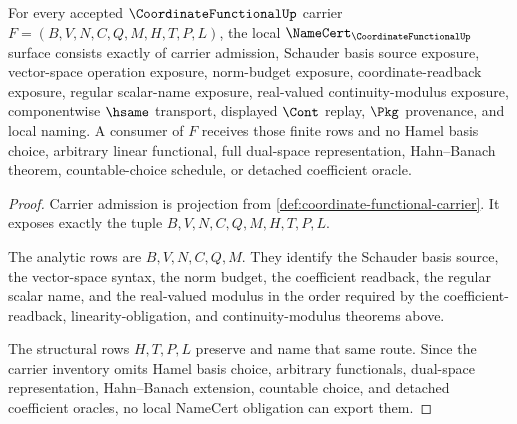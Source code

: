 \begin{theorem}
\label{thm:coordinate-functional-namecert-obligations}
For every accepted $\CoordinateFunctionalUp$ carrier $F=(B,V,N,C,Q,M,H,T,P,L)$, the local $\NameCert_{\CoordinateFunctionalUp}$ surface consists exactly of carrier admission, Schauder basis source exposure, vector-space operation exposure, norm-budget exposure, coordinate-readback exposure, regular scalar-name exposure, real-valued continuity-modulus exposure, componentwise $\hsame$ transport, displayed $\Cont$ replay, $\Pkg$ provenance, and local naming. A consumer of $F$ receives those finite rows and no Hamel basis choice, arbitrary linear functional, full dual-space representation, Hahn--Banach theorem, countable-choice schedule, or detached coefficient oracle.
\end{theorem}
\begin{proof}
Carrier admission is projection from \autoref{def:coordinate-functional-carrier}. It exposes exactly the tuple $B,V,N,C,Q,M,H,T,P,L$.

The analytic rows are $B,V,N,C,Q,M$. They identify the Schauder basis source, the vector-space syntax, the norm budget, the coefficient readback, the regular scalar name, and the real-valued modulus in the order required by the coefficient-readback, linearity-obligation, and continuity-modulus theorems above.

The structural rows $H,T,P,L$ preserve and name that same route. Since the carrier inventory omits Hamel basis choice, arbitrary functionals, dual-space representation, Hahn--Banach extension, countable choice, and detached coefficient oracles, no local NameCert obligation can export them.
\end{proof}



